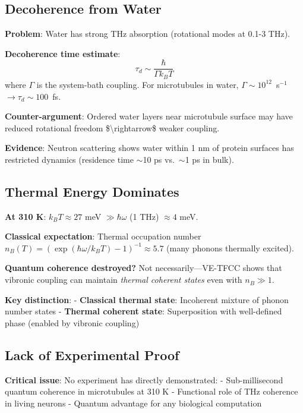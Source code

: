 \subsection{Decoherence from Water}\label{decoherence-from-water}

\textbf{Problem}: Water has strong THz absorption (rotational modes at
0.1-3 THz).

\textbf{Decoherence time estimate}:
\begin{equation}
\label{eq:decoherence-time}
\tau_d \sim \frac{\hbar}{\Gamma k_B T}
\end{equation}
where $\Gamma$ is the system-bath coupling. For microtubules in water, $\Gamma \sim 10^{12}$~s$^{-1}$ $\rightarrow \tau_d \sim 100$~fs.

\textbf{Counter-argument}: Ordered water layers near microtubule surface
may have reduced rotational freedom \$\textbackslash rightarrow\$ weaker
coupling.

\textbf{Evidence}: Neutron scattering shows water within 1 nm of protein
surfaces has restricted dynamics (residence time $\sim$10 ps
vs.~$\sim$1 ps in bulk).

\subsection{Thermal Energy Dominates}\label{thermal-energy-dominates}

\textbf{At 310 K}: \(k_B T \approx 27\) meV \(\gg \hbar \omega\) (1 THz)
\(\approx 4\) meV.

\textbf{Classical expectation}: Thermal occupation number
\(n_B(T) = (\exp(\hbar \omega / k_B T) - 1)^{-1} \approx 5.7\) (many
phonons thermally excited).

\textbf{Quantum coherence destroyed?} Not necessarily---VE-TFCC
shows that vibronic coupling can maintain \emph{thermal coherent states}
even with \(n_B \gg 1\).

\textbf{Key distinction}: - \textbf{Classical thermal state}: Incoherent
mixture of phonon number states - \textbf{Thermal coherent state}:
Superposition with well-defined phase (enabled by vibronic coupling)

\subsection{Lack of Experimental Proof}\label{lack-of-experimental-proof}

\textbf{Critical issue}: No experiment has directly demonstrated: -
Sub-millisecond quantum coherence in microtubules at 310 K - Functional
role of THz coherence in living neurons - Quantum advantage for any
biological computation

